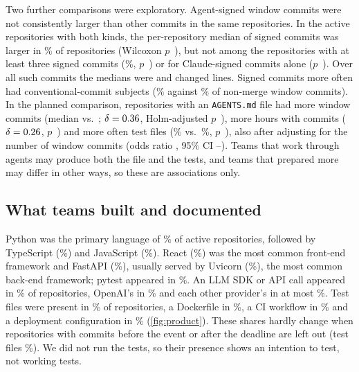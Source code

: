 \documentclass{article}
\begin{document}
Two further comparisons were exploratory. Agent-signed window commits were not consistently larger than other commits in the same repositories. In the \NRqTwoTracesCommitSizeAllRepos{} active repositories with both kinds, the per-repository median of signed commits was larger in \NRqTwoTracesCommitSizeAllSignedLargerPct\% of repositories (Wilcoxon $p$~\NRqTwoTracesCommitSizeAllP), but not among the \NRqTwoTracesCommitSizeMinThreeRepos{} repositories with at least three signed commits (\NRqTwoTracesCommitSizeMinThreeSignedLargerPct\%, $p$~\NRqTwoTracesCommitSizeMinThreeP) or for Claude-signed commits alone ($p$~\NRqTwoTracesCommitSizeClaudeP). Over all such commits the medians were \NRqTwoTracesCommitSizePooledSigned{} and \NRqTwoTracesCommitSizePooledUnsigned{} changed lines. Signed commits more often had conventional-commit subjects (\NRqTwoTracesConventionalSignedPct\% against \NRqTwoTracesConventionalUnsignedPct\% of non-merge window commits). In the planned comparison, repositories with an \texttt{AGENTS.md} file had more window commits (median \NRqTwoTracesAgentsMdAssocCommitsWith{} vs.\ \NRqTwoTracesAgentsMdAssocCommitsWithout; $\delta = \num{0.36}$, Holm-adjusted $p$~\NRqTwoTracesAgentsMdAssocCommitsP), more hours with commits ($\delta = \num{0.26}$, $p$~\NRqTwoTracesAgentsMdAssocHoursP) and more often test files (\NRqTwoTracesAgentsMdAssocTestsWith\% vs.\ \NRqTwoTracesAgentsMdAssocTestsWithout\%, $p$~\NRqTwoTracesAgentsMdAssocTestsP), also after adjusting for the number of window commits (odds ratio \NRqTwoTracesAgentsMdAssocTestsAdjustedOr, 95\% CI \NRqTwoTracesAgentsMdAssocTestsAdjustedLo--\NRqTwoTracesAgentsMdAssocTestsAdjustedHi). Teams that work through agents may produce both the file and the tests, and teams that prepared more may differ in other ways, so these are associations only.

\subsection{What teams built and documented}\label{sec:product}

Python was the primary language of \NRqThreePrimaryLanguagePythonPct\% of active repositories, followed by TypeScript (\NRqThreePrimaryLanguageTypeScriptPct\%) and JavaScript (\NRqThreePrimaryLanguageJavaScriptPct\%). React (\NRqThreeFrameworksReactPct\%) was the most common front-end framework and FastAPI (\NRqThreeFrameworksFastAPIPct\%), usually served by Uvicorn (\NRqThreeFrameworksUvicornPct\%), the most common back-end framework; pytest appeared in \NRqThreeFrameworksPytestPct\%. An LLM SDK or API call appeared in \NRqThreeAnyLlmPct\% of repositories, OpenAI's in \NRqThreeLlmProvidersOpenAIPct\% and each other provider's in at most \NRqThreeLlmProvidersAnthropicPct\%. Test files were present in \NRqThreeTestsPct\% of repositories, a Dockerfile in \NRqThreeDockerfilePct\%, a CI workflow in \NRqThreeCiPct\% and a deployment configuration in \NRqThreeDeployConfigPct\% (\cref{fig:product}). These shares hardly change when repositories with commits before the event or after the deadline are left out (test files \NRqThreeSensitivityNoPrePostTests\%). We did not run the tests, so their presence shows an intention to test, not working tests.
\end{document}

